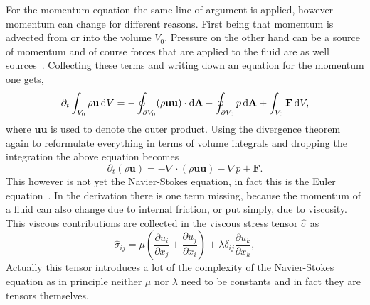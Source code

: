For the momentum equation the same line of argument is applied, however momentum can change for different reasons.
First being that momentum is advected from or into the volume $V_0$.
Pressure on the other hand can be a source of momentum and of course forces that are applied to the fluid are as well sources~\cite{krugerLatticeBoltzmannMethod2017}.
Collecting these terms and writing down an equation for the momentum one gets,
\begin{equation}\label{eq:navier_stokes_1}
    \partial_t \int_{V_0}\rho\mathbf{u}\mathop{}\!\mathrm{d} V = -\oint_{\partial V_0}(\rho\mathbf{u}\mathbf{u})\cdot\mathop{}\!\mathrm{d}\textbf{A} - \oint_{\partial V_0} p\mathop{}\!\mathrm{d}\textbf{A} + \int_{V_0} \textbf{F}\mathop{}\!\mathrm{d} V, 
\end{equation}
where $\mathbf{u}\mathbf{u}$ is used to denote the outer product.
Using the divergence theorem again to reformulate everything in terms of volume integrals and dropping the integration the above equation becomes
\begin{equation}\label{eq:navier_stokes_2}
    \partial_t(\rho\mathbf{u}) = -\nabla\cdot(\rho\mathbf{u}\mathbf{u}) - \nabla p + \textbf{F}.
\end{equation}
This however is not yet the Navier-Stokes equation, in fact this is the Euler equation~\cite{batchelor2000introduction}.
In the derivation there is one term missing, because the momentum of a fluid can also change due to internal friction, or put simply, due to viscosity.
This viscous contributions are collected in the viscous stress tensor $\hat{\sigma}$ as
\begin{equation}\label{eq:stress_tens}
    \hat{\sigma}_{ij} = \mu\left(\frac{\partial u_i}{\partial x_j} + \frac{\partial u_j}{\partial x_i}\right) + \lambda\delta_{ij}\frac{\partial u_k}{\partial x_k},
\end{equation}
Actually this tensor introduces a lot of the complexity of the Navier-Stokes equation as in principle neither $\mu$ nor $\lambda$ need to be constants and in fact they are tensors themselves.

